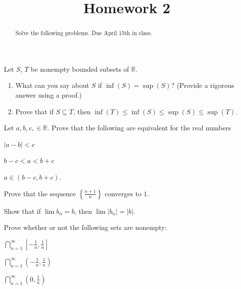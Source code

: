 \documentclass{ximera}
\begin{document}
    \title{Homework 2}
    \begin{abstract} Solve the following problems.  Due April 15th in class. \end{abstract}
    \maketitle

    \begin{exercise}
        Let $S$, $T$ be nonempty bounded subsets of $\mathbb{R}$.
        \begin{enumerate}
            \item What can you say about $S$ if $\inf(S) = \sup(S)$? (Provide a rigorous answer using a proof.)
            \item Prove that if $S \subseteq T$, then $\inf(T) \leq \inf(S) \leq \sup(S) \leq \sup(T)$.
        \end{enumerate}
    \end{exercise}
    \begin{exercise}
        Let $a,b,c, \in \mathbb{R}$.  Prove that the following are equivalent for the real numbers
        
        \phantom{blahblahblah} \begin{enumerate*}
            \item $|a-b| < c$ \phantom{blah}
            \item $b-c < a < b+c$ \phantom{blah}
            \item $a \in (b-c, b+c)$.
        \end{enumerate*}
    \end{exercise} 
    \begin{exercise}
        Prove that the sequence $\left\{\frac{n+1}{n}\right\}$ converges to $1$.
    \end{exercise}
    \begin{exercise}
        Show that if $\lim b_n = b$, then $\lim |b_n| = |b|$.
    \end{exercise}
    \begin{exercise}
        Prove whether or not the following sets are nonempty:
        
        \phantom{blahblahblahblah}
        \begin{enumerate*}
            \item $\bigcap\limits_{n=1}^\infty \left[-\frac1n, \frac1n\right]$ \phantom{blah}
            \item $\bigcap\limits_{n=1}^\infty \left(-\frac1n, \frac1n\right)$ \phantom{blah}
            \item $\bigcap\limits_{n=1}^\infty \left( 0, \frac1n\right)$
        \end{enumerate*}
    \end{exercise}
\end{document}
